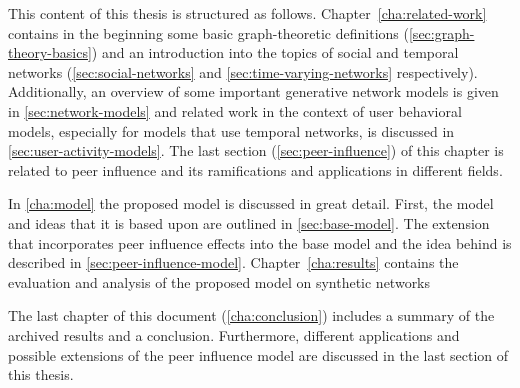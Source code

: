 This content of this thesis is structured as follows.
Chapter~\ref{cha:related-work} contains in the beginning some basic graph-theoretic definitions (\autoref{sec:graph-theory-basics}) and an introduction into the topics of social and temporal networks (\autoref{sec:social-networks} and \autoref{sec:time-varying-networks} respectively).
Additionally, an overview of some important generative network models is given in \autoref{sec:network-models} and related work in the context of user behavioral models, especially for models that use temporal networks, is discussed in \autoref{sec:user-activity-models}.
The last section (\autoref{sec:peer-influence}) of this chapter is related to peer influence and its ramifications and applications in different fields.

In \autoref{cha:model} the proposed model is discussed in great detail.
First, the model and ideas that it is based upon are outlined in \autoref{sec:base-model}.
The extension that incorporates peer influence effects into the base model and the idea behind is described in \autoref{sec:peer-influence-model}.
Chapter~\ref{cha:results} contains the evaluation and analysis of the proposed model on synthetic networks

The last chapter of this document (\autoref{cha:conclusion}) includes a summary of the archived results and a conclusion.
Furthermore, different applications and possible extensions of the peer influence model are discussed in the last section of this thesis.
